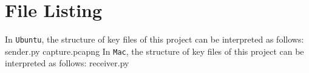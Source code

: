 \documentclass{article}%
\newenvironment{code}%
   {\snugshade\verbatim}%
   {\endverbatim\endsnugshade}
\begin{document}
\section{File Listing}
\begin{Large}
In \texttt{Ubuntu}, the structure of key files of this project can be interpreted as follows:
\begin{code}
    sender.py
    \packets
        capture.pcapng
\end{code}
In \texttt{Mac}, the structure of key files of this project can be interpreted as follows:
\begin{code}
    receiver.py
\end{code}
\end{Large}
\end{document}
